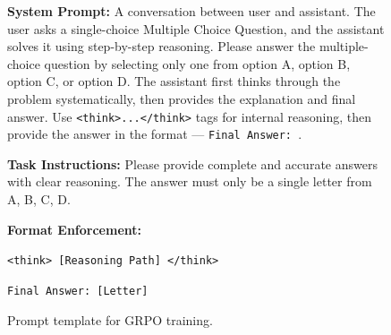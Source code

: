 \documentclass{article}
\theoremstyle{plain}
\theoremstyle{definition}
\theoremstyle{remark}
\begin{document}
\begin{figure}[H]
\centering
\begin{tcolorbox}[colback=gray!5, colframe=black!75, width=0.95\columnwidth, 
                  boxrule=0.5pt, arc=2pt]
\small
\textbf{System Prompt:} A conversation between user and assistant. The user asks a single-choice Multiple Choice Question, and the assistant solves it using step-by-step reasoning. Please answer the multiple-choice question by selecting only one from option A, option B, option C, or option D. The assistant first thinks through the problem systematically, then provides the explanation and final answer. Use \texttt{<think>...</think>} tags for internal reasoning, then provide the answer in the format --- \texttt{Final Answer: }.

\vspace{0.4em}
\textbf{Task Instructions:} Please provide complete and accurate answers with clear reasoning. The answer must only be a single letter from A, B, C, D.

\vspace{0.4em}
\textbf{Format Enforcement:}

\texttt{<think> [Reasoning Path] </think>}

\texttt{Final Answer: [Letter]}
\end{tcolorbox}
\caption{Prompt template for GRPO training.}
\label{fig:prompt_template}
\end{figure}

\end{document}
